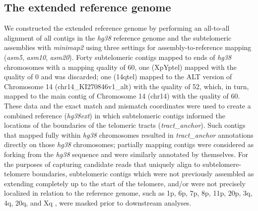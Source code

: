 \documentclass{article}
\begin{document}
\subsection*{The extended reference genome}
    We constructed the extended reference genome by performing an all-to-all alignment
        of all contigs in the \textit{hg38} reference genome \parencite{grch38,hg38}
        and the subtelomeric assemblies \parencite{riethman2014}
        with \textit{minimap2} \parencite{minimap} using three settings
            for assembly-to-reference mapping (\textit{asm5}, \textit{asm10}, \textit{asm20}).
    Forty subtelomeric contigs mapped to ends of \textit{hg38} chromosomes with a mapping quality of 60,
        one (XpYptel) mapped with the quality of 0 and was discarded;
        one (14qtel) mapped to the ALT version of Chromosome 14 (chr14\_KI270846v1\_alt) with the quality of 52,
            which, in turn, mapped to the main contig of Chromosome 14 (chr14) with the quality of 60.
    These data and the exact match and mismatch coordinates were used to create a combined reference (\textit{hg38ext})
        in which subtelomeric contigs informed the locations of the boundaries of the telomeric tracts (\textit{tract\_anchor}).
    Such contigs that mapped fully within \textit{hg38} chromosomes resulted in \textit{tract\_anchor} annotations
            directly on those \textit{hg38} chromosomes;
        partially mapping contigs were considered as forking from the \textit{hg38} sequence and were similarly annotated by themselves.
    For the purposes of capturing candidate reads that uniquely align to subtelomere-telomere boundaries,
        subtelomeric contigs which were not previously assembled as extending completely up to the start of the telomere,
        and/or were not precisely localized in relation to the reference genome,
        such as 1p, 6p, 7p, 8p, 11p, 20p, 3q, 4q, 20q, and Xq \parencite{riethman2014,riethman2020},
        were masked prior to downstream analyses.
\end{document}
